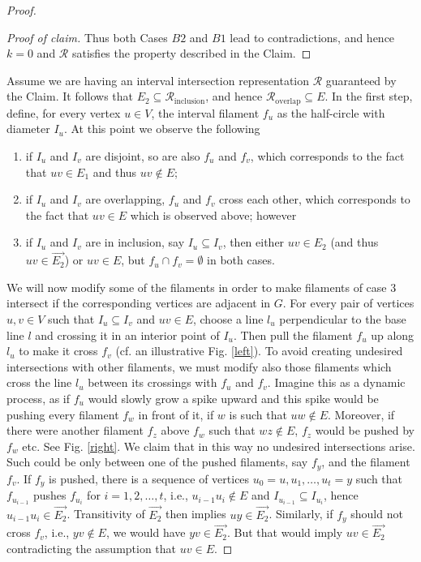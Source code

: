 \begin{proof}
\begin{proof}[Proof of claim]
		Thus both Cases $B2$ and $B1$ lead to contradictions, and hence $k = 0$ and $\mathcal{R}$ satisfies the property described in the Claim.
	\end{proof}
	
	Assume we are having an interval intersection representation $\mathcal{R}$ guaranteed by the Claim. It follows that $E_2 \subseteq \mathcal{R}_\text{inclusion}$, and hence $\mathcal{R}_\text{overlap} \subseteq E$. In the first step, define, for every vertex $u \in V$, the interval filament $f_u$ as the half-circle with diameter $I_u$. At this point we observe the following
	
	\begin{enumerate}
		\item if $I_u$ and $I_v$ are disjoint, so are also $f_u$ and $f_v$, which corresponds to the fact that $uv \in E_1$ and thus $uv \notin E$;
		\item if $I_u$ and $I_v$ are overlapping, $f_u$ and $f_v$ cross each other, which corresponds to the fact that $uv \in E$ which is observed above; however
		\item if $I_u$ and $I_v$ are in inclusion, say $I_u \subseteq I_v$, then either $uv \in E_2$ (and thus $uv \in \overrightarrow{E_2}$) or $uv \in E$, but $f_u \cap f_v = \emptyset$ in both cases.
	\end{enumerate}
	
	We will now modify some of the filaments in order to make filaments of case 3 intersect if the corresponding vertices are adjacent in $G$. For every pair of vertices $u, v \in V$ such that $I_u \subseteq I_v$ and $uv \in E$, choose a line $l_u$ perpendicular to the base line $l$ and crossing it in an interior point of $I_u$. Then pull the filament $f_u$ up along $l_u$ to make it cross $f_v$ (cf. an illustrative Fig. \ref{left}). To avoid creating undesired intersections with other filaments, we must modify also those filaments which cross the line $l_u$ between its crossings with $f_u$ and $f_v$. Imagine this as a dynamic process, as if $f_u$ would slowly grow a spike upward and this spike would be pushing every filament $f_w$ in front of it, if $w$ is such that $uw \notin E$. Moreover, if there were another filament $f_z$ above $f_w$ such that $wz \notin E$, $f_z$ would be pushed by $f_w$ etc. See Fig. \ref{right}. We claim that in this way no undesired intersections arise. Such could be only between one of the pushed filaments, say $f_y$, and the filament $f_v$. If $f_y$ is pushed, there is a sequence of vertices $u_0 = u, u_1 , \dots , u_t = y$ such that $f_{u_{i-1}}$ pushes $f_{u_{i}}$ for $i = 1, 2, \dots , t$, i.e., $u_{i-1} u_i \notin E$	and $I_{u_{i-1}} \subseteq I_{u_{i}}$, hence $u_{i-1} u_i \in \overrightarrow{E_2}$. Transitivity of $\overrightarrow{E_2}$ then implies $uy \in \overrightarrow{E_2}$. Similarly, if $f_y$ should not cross $f_v$, i.e., $yv \notin E$, we would have $yv \in \overrightarrow{E_2}$. But that would imply $uv \in \overrightarrow{E_2}$ contradicting the assumption that $uv \in E$.
	

\end{proof}
